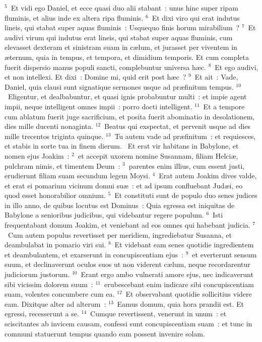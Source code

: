 ${}^{5}$~Et vidi ego Daniel, et ecce quasi duo alii stabant~: unus hinc super ripam fluminis, et alius inde ex altera ripa fluminis.
${}^{6}$~Et dixi viro qui erat indutus lineis, qui stabat super aquas fluminis~: Usquequo finis horum mirabilium~?
${}^{7}$~Et audivi virum qui indutus erat lineis, qui stabat super aquas fluminis, cum elevasset dexteram et sinistram suam in c\ae lum, et jurasset per viventem in \ae ternum, quia in tempus, et tempora, et dimidium temporis. Et cum completa fuerit dispersio manus populi sancti, complebuntur universa h\ae c.
${}^{8}$~Et ego audivi, et non intellexi. Et dixi~: Domine mi, quid erit post h\ae c~?
${}^{9}$~Et ait~: Vade, Daniel, quia clausi sunt signatique sermones usque ad pr\ae finitum tempus.
${}^{10}$~Eligentur, et dealbabuntur, et quasi ignis probabuntur multi~: et impie agent impii, neque intelligent omnes impii~: porro docti intelligent.
${}^{11}$~Et a tempore cum ablatum fuerit juge sacrificium, et posita fuerit abominatio in desolationem, dies mille ducenti nonaginta.
${}^{12}$~Beatus qui exspectat, et pervenit usque ad dies mille trecentos triginta quinque.
${}^{13}$~Tu autem vade ad pr\ae finitum~: et requiesces, et stabis in sorte tua in finem dierum.
~\lettrine[lines=10,image=true,loversize=0.05,lraise=-0.03]{E}{}t erat vir habitans in Babylone, et nomen ejus Joakim~:
${}^{2}$~et accepit uxorem nomine Susannam, filiam Helci\ae , pulchram nimis, et timentem Deum~:
${}^{3}$~parentes enim illius, cum essent justi, erudierunt filiam suam secundum legem Moysi.
${}^{4}$~Erat autem Joakim dives valde, et erat ei pomarium vicinum domui su\ae~: et ad ipsum confluebant Jud\ae i, eo quod esset honorabilior omnium.
${}^{5}$~Et constituti sunt de populo duo senes judices in illo anno, de quibus locutus est Dominus~: Quia egressa est iniquitas de Babylone a senioribus judicibus, qui videbantur regere populum.
${}^{6}$~Isti frequentabant domum Joakim, et veniebant ad eos omnes qui habebant judicia.
${}^{7}$~Cum autem populus revertisset per meridiem, ingrediebatur Susanna, et deambulabat in pomario viri sui.
${}^{8}$~Et videbant eam senes quotidie ingredientem et deambulantem, et exarserunt in concupiscentiam ejus~:
${}^{9}$~et everterunt sensum suum, et declinaverunt oculos suos ut non viderent c\ae lum, neque recordarentur judiciorum justorum.
${}^{10}$~Erant ergo ambo vulnerati amore ejus, nec indicaverunt sibi vicissim dolorem suum~:
${}^{11}$~erubescebant enim indicare sibi concupiscentiam suam, volentes concumbere cum ea.
${}^{12}$~Et observabant quotidie sollicitius videre eam. Dixitque alter ad alterum~:
${}^{13}$~Eamus domum, quia hora prandii est. Et egressi, recesserunt a se.
${}^{14}$~Cumque revertissent, venerunt in unum~: et sciscitantes ab invicem causam, confessi sunt concupiscentiam suam~: et tunc in communi statuerunt tempus quando eam possent invenire solam.


